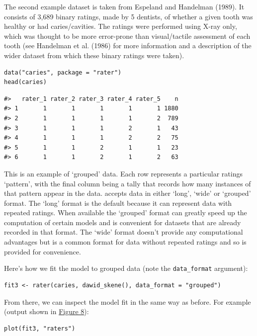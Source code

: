 The second example dataset is taken from Espeland and Handelman (1989). It consists of
3,689 binary ratings, made by 5 dentists, of whether a given tooth was healthy
or had caries/cavities. The ratings were performed using X-ray
only, which was thought to be more error-prone than visual/tactile assessment
of each tooth (see Handelman et al. (1986) for more information and a description
of the wider dataset from which these binary ratings were taken).

\begin{verbatim}
data("caries", package = "rater")
head(caries)
\end{verbatim}

\begin{verbatim}
#>   rater_1 rater_2 rater_3 rater_4 rater_5    n
#> 1       1       1       1       1       1 1880
#> 2       1       1       1       1       2  789
#> 3       1       1       1       2       1   43
#> 4       1       1       1       2       2   75
#> 5       1       1       2       1       1   23
#> 6       1       1       2       1       2   63
\end{verbatim}

This is an example of `grouped' data. Each row represents a particular ratings
`pattern', with the final column being a tally that records how many instances
of that pattern appear in the data.  accepts data in either
`long', `wide' or `grouped' format. The `long' format is the default because
it can represent data with repeated ratings. When available the `grouped'
format can greatly speed up the computation of certain models and is convenient
for datasets that are already
recorded in that format. The `wide' format doesn't provide any computational
advantages but is a common format for data without repeated ratings and so is
provided for convenience.

Here's how we fit the model to grouped data (note the \texttt{data\_format}
argument):

\begin{verbatim}
fit3 <- rater(caries, dawid_skene(), data_format = "grouped")
\end{verbatim}

From there, we can inspect the model fit in the same way as before. For
example (output shown in \protect\hyperlink{fig:plot-theta-caries}{Figure 8}):

\begin{verbatim}
plot(fit3, "raters")
\end{verbatim}

